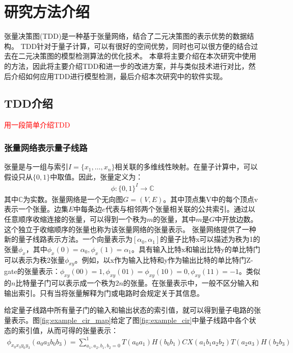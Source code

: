 \chapter{研究方法介绍}
张量决策图(TDD)是一种基于张量网络，结合了二元决策图的表示优势的数据结构。
TDD针对于量子计算，可以有很好的空间优势，同时也可以很方便的结合过去在二元决策图的模型检测算法的优化技术。
本章将主要介绍在本次研究中使用的方法，因此将主要介绍TDD和进一步的改进方案，并与类似技术进行对比，然后介绍如何应用TDD进行模型检测，最后介绍本次研究中的软件实现。
\section{TDD介绍}
\textcolor{red}{用一段简单介绍TDD}
\subsection{张量网络表示量子线路}
张量是与一组与索引\(I=\{x_1,\ldots,x_n\}\)相关联的多维线性映射。在量子计算中，可以假设只从\(\{0,1\}\)中取值。因此，张量定义为：
\begin{align}
    \phi :{\{0,1\}}^I\rightarrow\mathbb{C}
\end{align}
其中\(\mathbb{C}\)为实数。张量网络是一个无向图\(G=\left(V,E\right)\)。其中顶点集V中的每个顶点v表示一个张量。边集\(E\)中每条边\(e\)代表与相邻两个张量相关联的公共索引。通过以任意顺序收缩连接的张量，可以得到一个秩为\(m\)的张量，其中\(m\)是$G$中开放边数。这个独立于收缩顺序的张量也称为该张量网络的张量表示\citep{biamonte2019lectures}。
张量网络提供了一种新的量子线路表示方法\citep{pednault2017breaking}。一个向量表示为$[\alpha_0,\alpha_1]$的量子比特x可以描述为秩为1的张量$\phi_x$，其中$\phi_x\left(0\right)=\alpha_0, \phi_x\left(1\right)=\alpha_1$。具有输入比特x和输出比特y的单比特门可以表示为秩2张量$\phi_{xy}$。例如，以x作为输入比特和y作为输出比特的单比特门Z-gate的张量表示：$\phi_{xy}\left(00\right)=1,\phi_{xy}\left(01\right)=\phi_{xy}\left(10\right)=0,\phi_{xy}\left(11\right)=-1$。类似的$n$比特量子门可以表示成一个秩为$2n$的张量。在张量表示中，一般不区分输入和输出索引。只有当将张量解释为门或电路时会规定关于其信息。

给定量子线路中所有量子门的输入和输出状态的索引值，就可以得到量子电路的张量表示。图\ref{fig:example_cir_map}给定了图\ref{fig:example_cir}中量子线路中各个状态的索引值，从而可得的张量表示：
\begin{align}
\phi_{x_0x_3y_0y_3}\left(a_0a_3b_0b_3\right)=\sum_{a_1,a_2,b_1,b_2=0}^{1}T\left(a_0a_1\right)H\left(b_0b_1\right)CX\left(a_1b_1a_2b_2\right)T\left(a_2a_3\right)H\left(b_2b_3\right)
\end{align}

